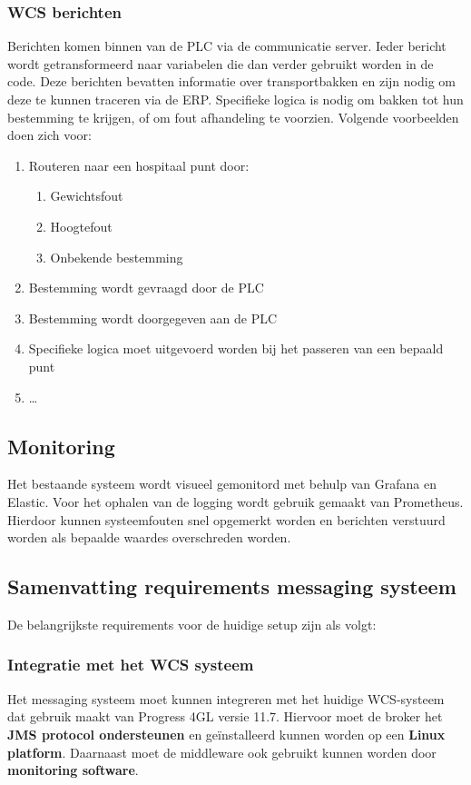 \subsubsection{WCS berichten} 
Berichten komen binnen van de PLC via de communicatie server. Ieder bericht wordt getransformeerd naar variabelen die dan verder gebruikt worden in de code.
Deze berichten bevatten informatie over transportbakken en zijn nodig om deze te kunnen traceren via de ERP.
Specifieke logica is nodig om bakken tot hun bestemming te krijgen, of om fout afhandeling te voorzien.
Volgende voorbeelden doen zich voor:
\begin{enumerate}
\item Routeren naar een hospitaal punt door: 
\begin{enumerate}
  \item Gewichtsfout
  \item Hoogtefout
  \item Onbekende bestemming
\end{enumerate}
\item Bestemming wordt gevraagd door de PLC
\item Bestemming wordt doorgegeven aan de PLC 
\item Specifieke logica moet uitgevoerd worden bij het passeren van een bepaald punt
\item \dots
\end{enumerate}

\subsection{Monitoring}
Het bestaande systeem wordt visueel gemonitord met behulp van Grafana en Elastic. 
Voor het ophalen van de logging wordt gebruik gemaakt van Prometheus.
Hierdoor kunnen systeemfouten snel opgemerkt worden en berichten verstuurd worden als bepaalde waardes overschreden worden.
\newpage

\subsection{Samenvatting requirements messaging systeem}
De belangrijkste requirements voor de huidige setup zijn als volgt:

\subsubsection{Integratie met het WCS systeem}
Het messaging systeem moet kunnen integreren met het huidige WCS-systeem dat gebruik maakt van Progress 4GL versie 11.7. 
Hiervoor moet de broker het \textbf{JMS protocol ondersteunen} en geïnstalleerd kunnen worden op een \textbf{Linux platform}.
Daarnaast moet de middleware ook gebruikt kunnen worden door \textbf{monitoring software}.

